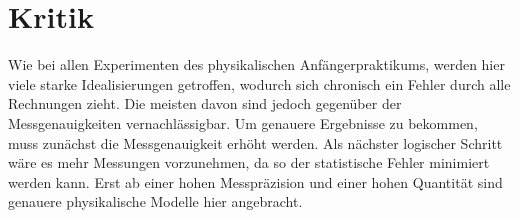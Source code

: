 \section{Kritik}
Wie bei allen Experimenten des physikalischen Anfängerpraktikums, werden hier viele starke Idealisierungen getroffen, wodurch sich chronisch ein Fehler durch alle Rechnungen zieht. Die meisten davon sind jedoch gegenüber der Messgenauigkeiten vernachlässigbar. Um genauere Ergebnisse zu bekommen, muss zunächst die Messgenauigkeit erhöht werden. Als nächster logischer Schritt wäre es mehr Messungen vorzunehmen, da so der statistische Fehler minimiert werden kann. Erst ab einer hohen Messpräzision und einer hohen Quantität sind genauere physikalische Modelle hier angebracht.